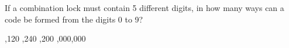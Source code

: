 \begin{questions}
\question If a combination lock must contain 5 different digits, in how many ways can a code be formed from the digits 0 to 9? 
\begin{multicols}{4}
\begin{choices} 
,120
,240
,200
,000,000  
\end{choices}
\end{multicols} 



\end{questions}